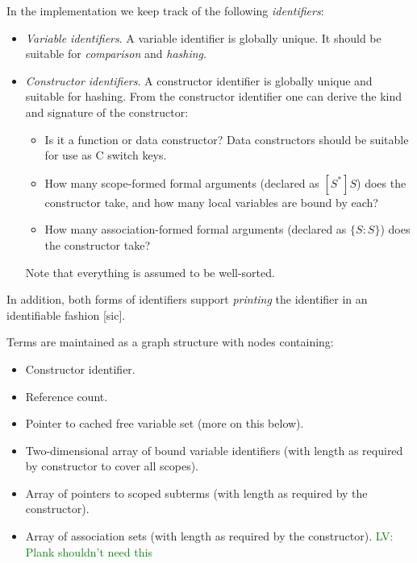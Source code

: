 \documentclass[letterpaper,11pt]{article}
\newcommand{\LV}[1]{\textcolor{green}{LV: #1}}
\begin{document}
\begin{definition}[identifiers]
  In the implementation we keep track of the following \emph{identifiers}:
  \begin{itemize}

  \item \emph{Variable identifiers}. A variable identifier is globally unique. It should be suitable
    for \emph{comparison} and \emph{hashing}.

  \item \emph{Constructor identifiers}. A constructor identifier is globally unique and suitable for
    hashing. From the constructor identifier one can derive the kind and signature of the
    constructor:
    \begin{itemize}
    \item Is it a function or data constructor? Data constructors should be suitable for use as C
      switch keys.
    \item How many scope-formed formal arguments (declared as $[S^*]S$) does the constructor take,
      and how many local variables are bound by each?
    \item How many association-formed formal arguments (declared as $\{S:S\}$) does the constructor
      take?
    \end{itemize}
    Note that everything is assumed to be well-sorted.

  \end{itemize}
  In addition, both forms of identifiers support \emph{printing} the identifier in an identifiable
  fashion [sic].
\end{definition}

\begin{structure}
  Terms are maintained as a graph structure with nodes containing:
  \begin{itemize}
  \item Constructor identifier.
  \item Reference count.
  \item Pointer to cached free variable set (more on this below).
  \item Two-dimensional array of bound variable identifiers (with length as required by constructor to cover all
    scopes). 
  \item Array of pointers to scoped subterms (with length as required by the constructor).
  \item Array of association sets (with length as required by the constructor). \LV{Plank shouldn't need this}
  \end{itemize}
\end{structure}
\end{document}
